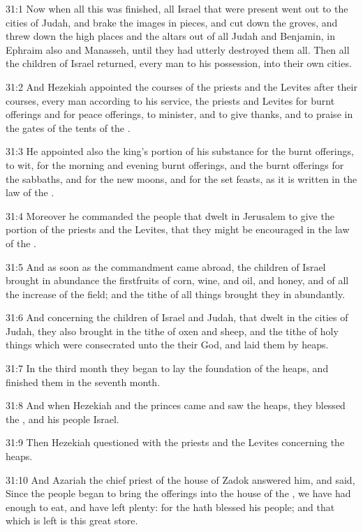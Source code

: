 31:1 Now when all this was finished, all Israel that were present went
out to the cities of Judah, and brake the images in pieces, and cut
down the groves, and threw down the high places and the altars out of
all Judah and Benjamin, in Ephraim also and Manasseh, until they had
utterly destroyed them all. Then all the children of Israel returned,
every man to his possession, into their own cities.

31:2 And Hezekiah appointed the courses of the priests and the Levites
after their courses, every man according to his service, the priests
and Levites for burnt offerings and for peace offerings, to minister,
and to give thanks, and to praise in the gates of the tents of the
\LORD.

31:3 He appointed also the king's portion of his substance for the
burnt offerings, to wit, for the morning and evening burnt offerings,
and the burnt offerings for the sabbaths, and for the new moons, and
for the set feasts, as it is written in the law of the \LORD.

31:4 Moreover he commanded the people that dwelt in Jerusalem to give
the portion of the priests and the Levites, that they might be
encouraged in the law of the \LORD.

31:5 And as soon as the commandment came abroad, the children of
Israel brought in abundance the firstfruits of corn, wine, and oil,
and honey, and of all the increase of the field; and the tithe of all
things brought they in abundantly.

31:6 And concerning the children of Israel and Judah, that dwelt in
the cities of Judah, they also brought in the tithe of oxen and sheep,
and the tithe of holy things which were consecrated unto the \LORD
their God, and laid them by heaps.

31:7 In the third month they began to lay the foundation of the heaps,
and finished them in the seventh month.

31:8 And when Hezekiah and the princes came and saw the heaps, they
blessed the \LORD, and his people Israel.

31:9 Then Hezekiah questioned with the priests and the Levites
concerning the heaps.

31:10 And Azariah the chief priest of the house of Zadok answered him,
and said, Since the people began to bring the offerings into the house
of the \LORD, we have had enough to eat, and have left plenty: for the
\LORD hath blessed his people; and that which is left is this great
store.

